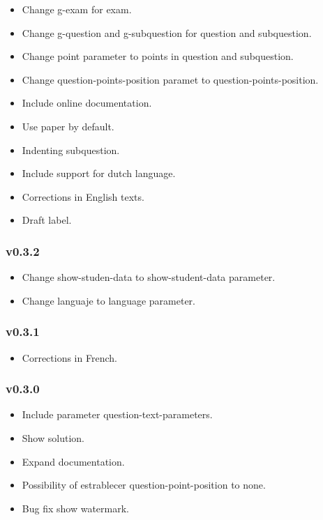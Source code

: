 \begin{itemize}
\tightlist
\item
  Change g-exam for exam.
\item
  Change g-question and g-subquestion for question and subquestion.
\item
  Change point parameter to points in question and subquestion.
\item
  Change question-points-position paramet to question-points-position.
\item
  Include online documentation.
\item
  Use paper by default.
\item
  Indenting subquestion.
\item
  Include support for dutch language.
\item
  Corrections in English texts.
\item
  Draft label.
\end{itemize}

\subsubsection{v0.3.2}\label{v0.3.2}

\begin{itemize}
\tightlist
\item
  Change show-studen-data to show-student-data parameter.
\item
  Change languaje to language parameter.
\end{itemize}

\subsubsection{v0.3.1}\label{v0.3.1}

\begin{itemize}
\tightlist
\item
  Corrections in French.
\end{itemize}

\subsubsection{v0.3.0}\label{v0.3.0}

\begin{itemize}
\tightlist
\item
  Include parameter question-text-parameters.
\item
  Show solution.
\item
  Expand documentation.
\item
  Possibility of estrablecer question-point-position to none.
\item
  Bug fix show watermark.
\end{itemize}

